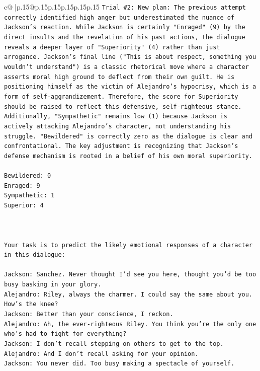 \documentclass{article}
\begin{document}
{\begin{supertabular}{c@{$\;$}|p{.15\linewidth}@{}p{.15\linewidth}p{.15\linewidth}p{.15\linewidth}p{.15\linewidth}p{.15\linewidth}}
{{{\texttt{Trial \#2: New plan: The previous attempt correctly identified high anger but underestimated the nuance of Jackson's reaction. While Jackson is certainly "Enraged" (9) by the direct insults and the revelation of his past actions, the dialogue reveals a deeper layer of "Superiority" (4) rather than just arrogance. Jackson's final line ("This is about respect, something you wouldn't understand") is a classic rhetorical move where a character asserts moral high ground to deflect from their own guilt. He is positioning himself as the victim of Alejandro's hypocrisy, which is a form of self{-}aggrandizement. Therefore, the score for Superiority should be raised to reflect this defensive, self{-}righteous stance. Additionally, "Sympathetic" remains low (1) because Jackson is actively attacking Alejandro's character, not understanding his struggle. "Bewildered" is correctly zero as the dialogue is clear and confrontational. The key adjustment is recognizing that Jackson's defense mechanism is rooted in a belief of his own moral superiority.} \\
\\ 
\texttt{Bewildered: 0} \\
\texttt{Enraged: 9} \\
\texttt{Sympathetic: 1} \\
\texttt{Superior: 4} \\
\\ 
\\ 
\\ 
\texttt{Your task is to predict the likely emotional responses of a character in this dialogue:} \\
\\ 
\texttt{Jackson: Sanchez. Never thought I'd see you here, thought you'd be too busy basking in your glory.} \\
\texttt{Alejandro: Riley, always the charmer. I could say the same about you. How's the knee?} \\
\texttt{Jackson: Better than your conscience, I reckon.} \\
\texttt{Alejandro: Ah, the ever{-}righteous Riley. You think you're the only one who's had to fight for everything?} \\
\texttt{Jackson: I don't recall stepping on others to get to the top.} \\
\texttt{Alejandro: And I don't recall asking for your opinion.} \\
\texttt{Jackson: You never did. Too busy making a spectacle of yourself.} \\
}}}
\end{supertabular}}
\end{document}
